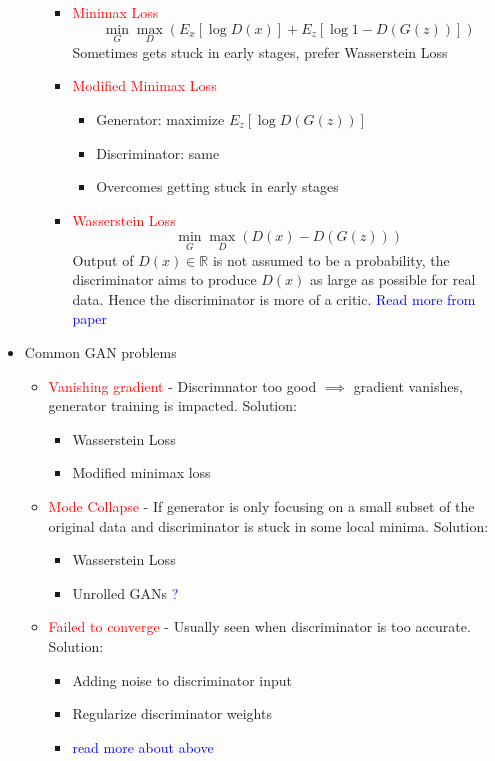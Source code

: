 \documentclass[11pt]{article}
\newcommand{\red}[1]{\textcolor{red}{#1}}
\newcommand{\blue}[1]{\textcolor{blue}{#1}}
\begin{document}
\begin{itemize}
\begin{itemize}
            \begin{itemize}
                \item \red{Minimax Loss}
                $$\min_G \max_D \left( E_{x}{[\log {D(x)}]} + E_{z}{[\log{1-D(G(z))}]} \right)$$
                Sometimes gets stuck in early stages, prefer Wasserstein Loss
                \item \red{Modified Minimax Loss}
                \begin{itemize}
                    \item Generator: maximize $E_{z}{[\log{D(G(z))}]}$
                    \item Discriminator: same
                    \item Overcomes getting stuck in early stages
                \end{itemize}
                \item \red{Wasserstein Loss}
                $$\min_G \max_D \left( D(x)-D(G(z)) \right)$$
                Output of $D(x) \in \mathbb{R}$ is not assumed to be a probability, the discriminator aims to produce $D(x)$ as large as possible for real data. Hence the discriminator is more of a critic. \blue{Read more from paper}

            \end{itemize}
        \end{itemize}
        \item Common GAN problems
        \begin{itemize}
            \item \red{Vanishing gradient} - Discrimnator too good $\implies$ gradient vanishes, generator training is impacted. Solution:
            \begin{itemize}
                \item Wasserstein Loss
                \item Modified minimax loss
            \end{itemize}
            \item \red{Mode Collapse} - If generator is only focusing on a small subset of the original data and discriminator is stuck in some local minima. Solution:
            \begin{itemize}
                \item Wasserstein Loss
                \item Unrolled GANs \blue{?}
            \end{itemize}
            \item \red{Failed to converge} - Usually seen when discriminator is too accurate. Solution:
            \begin{itemize}
                \item Adding noise to discriminator input
                \item Regularize discriminator weights
                \item \blue{read more about above}
            \end{itemize}
        \end{itemize}
    \end{itemize}
\end{document}
